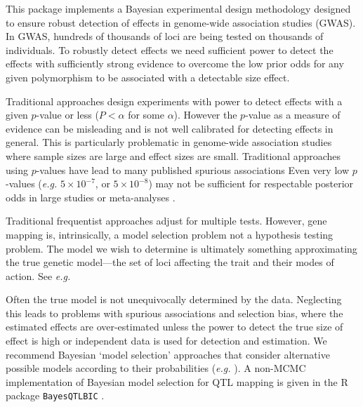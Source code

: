 \documentclass[a4paper,10pt]{amsart}
\def\BayesQTLBIC{\texttt{BayesQTLBIC}}
\def\eg{\textit{e.g.}}
\begin{document}
This package implements a Bayesian experimental design methodology
designed to ensure robust detection of effects in genome-wide
association studies (GWAS).  In GWAS, hundreds of thousands of loci
are being tested on thousands of individuals. To robustly detect
effects we need sufficient power to detect the effects with
sufficiently strong evidence to overcome the low prior odds for any
given polymorphism to be associated with a detectable size effect.

Traditional approaches design experiments with power to detect effects
with a given $p$-value or less ($P < \alpha$ for some $\alpha$).
However the $p$-value as a measure of evidence can be misleading and
is not well calibrated for detecting effects in general. This is
particularly problematic in genome-wide association studies where
sample sizes are large and effect sizes are small. Traditional
approaches using $p$-values have lead to many published spurious
associations
\citep{Altshuleretal2000,TerwilligerWeiss1998,Emahazionetal2001,
  Ball2005exptdesignbf,Ball2007AssocMapInPlantsCh8,Ball2007QTLcolocation,
  Ball2011exptdesigngwcc}
Even very low $p$-values (\eg{} $5\times 10^{-7}$,
or $5\times 10^{-8}$) may not be sufficient for respectable posterior
odds in large studies or meta-analyses \citep{Ball2011exptdesigngwcc}.

Traditional frequentist approaches adjust for multiple tests.
However, gene mapping is, intrinsically, a model selection problem not
a hypothesis testing problem. The model we wish to determine is
ultimately something approximating the true genetic model---the set of
loci affecting the trait and their modes of action.  See \eg{} 
\citep[and references therein]{Ball2001,SillanpaaCorander2002}


Often the true model is not unequivocally determined by the data.
Neglecting this leads to problems with spurious associations and
selection bias, where the estimated effects are over-estimated unless
the power to detect the true size of effect is high or independent
data is used for detection and estimation. We recommend Bayesian
`model selection' approaches that consider alternative possible models
according to their probabilities (\eg{} \cite{Ball2001}). A
non-MCMC implementation of Bayesian model selection for QTL mapping is
given in the R package \BayesQTLBIC{} \citep{Ball2009BayesQTLBIC}.
\end{document}
